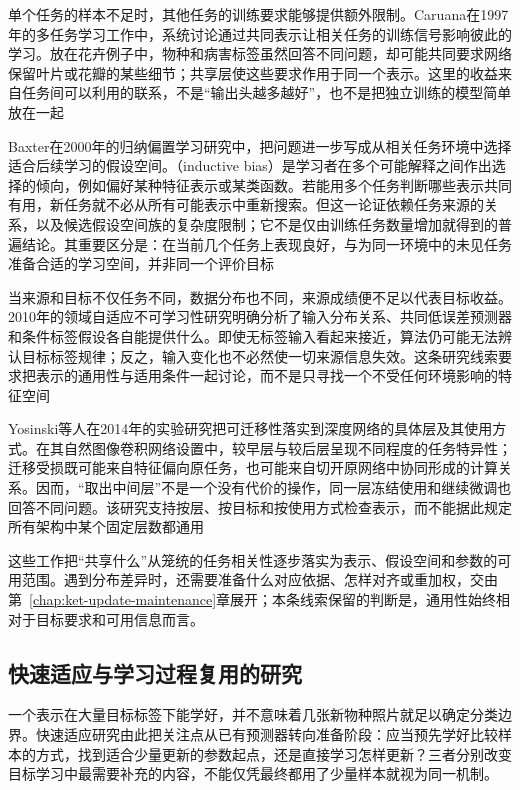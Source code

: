 单个任务的样本不足时，其他任务的训练要求能够提供额外限制。Caruana在1997年的多任务学习工作中，系统讨论通过共同表示让相关任务的训练信号影响彼此的学习。放在花卉例子中，物种和病害标签虽然回答不同问题，却可能共同要求网络保留叶片或花瓣的某些细节；共享层使这些要求作用于同一个表示。这里的收益来自任务间可以利用的联系，不是“输出头越多越好”，也不是把独立训练的模型简单放在一起

Baxter在2000年的归纳偏置学习研究中，把问题进一步写成从相关任务环境中选择适合后续学习的假设空间。（inductive bias）是学习者在多个可能解释之间作出选择的倾向，例如偏好某种特征表示或某类函数。若能用多个任务判断哪些表示共同有用，新任务就不必从所有可能表示中重新搜索。但这一论证依赖任务来源的关系，以及候选假设空间族的复杂度限制；它不是仅由训练任务数量增加就得到的普遍结论。其重要区分是：在当前几个任务上表现良好，与为同一环境中的未见任务准备合适的学习空间，并非同一个评价目标

当来源和目标不仅任务不同，数据分布也不同，来源成绩便不足以代表目标收益。2010年的领域自适应不可学习性研究明确分析了输入分布关系、共同低误差预测器和条件标签假设各自能提供什么。即使无标签输入看起来接近，算法仍可能无法辨认目标标签规律；反之，输入变化也不必然使一切来源信息失效。这条研究线索要求把表示的通用性与适用条件一起讨论，而不是只寻找一个不受任何环境影响的特征空间

Yosinski等人在2014年的实验研究把可迁移性落实到深度网络的具体层及其使用方式。在其自然图像卷积网络设置中，较早层与较后层呈现不同程度的任务特异性；迁移受损既可能来自特征偏向原任务，也可能来自切开原网络中协同形成的计算关系。因而，“取出中间层”不是一个没有代价的操作，同一层冻结使用和继续微调也回答不同问题。该研究支持按层、按目标和按使用方式检查表示，而不能据此规定所有架构中某个固定层数都通用

这些工作把“共享什么”从笼统的任务相关性逐步落实为表示、假设空间和参数的可用范围。遇到分布差异时，还需要准备什么对应依据、怎样对齐或重加权，交由第~\ref{chap:ket-update-maintenance}章展开；本条线索保留的判断是，通用性始终相对于目标要求和可用信息而言。

\subsection{快速适应与学习过程复用的研究}
\label{sec:ket-overview-history-adaptation}

一个表示在大量目标标签下能学好，并不意味着几张新物种照片就足以确定分类边界。快速适应研究由此把关注点从已有预测器转向准备阶段：应当预先学好比较样本的方式，找到适合少量更新的参数起点，还是直接学习怎样更新？三者分别改变目标学习中最需要补充的内容，不能仅凭最终都用了少量样本就视为同一机制。

